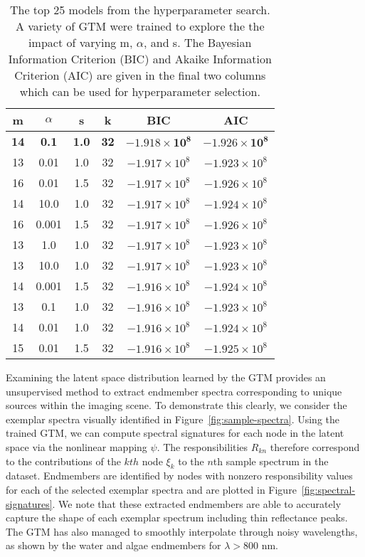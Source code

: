 \begin{table}
  \caption{The top 25 models from the hyperparameter search. A variety of GTM
    were trained to explore the the impact of varying m, $\alpha$, and s. The
    Bayesian Information Criterion (BIC) and Akaike Information Criterion (AIC)
    are given in the final two columns which can be used for hyperparameter
    selection.}
  \label{tab:hp-search}
  \begin{center}
  \begin{tabular}{cccccc} \hline
    \textbf{m} & \textbf{\boldmath$\alpha$} & \textbf{s} & \textbf{k} & \textbf{BIC} & \textbf{AIC} \\ \hline
    \textbf{14} & \textbf{0.1} & \textbf{1.0} & \textbf{32} & $\mathbf{-1.918 \times 10^8}$ & $\mathbf{-1.926 \times 10^8}$\\
    13 & 0.01 & 1.0 & 32 & $-1.917 \times 10^8$ & $-1.923 \times 10^8$\\
    16 & 0.01 & 1.5 & 32 & $-1.917 \times 10^8$ & $-1.926 \times 10^8$\\
    14 & 10.0 & 1.0 & 32 & $-1.917 \times 10^8$ & $-1.924 \times 10^8$\\
    16 & 0.001 & 1.5 & 32 & $-1.917 \times 10^8$ & $-1.926 \times 10^8$\\
    13 & 1.0 & 1.0 & 32 & $-1.917 \times 10^8$ & $-1.923 \times 10^8$\\
    13 & 10.0 & 1.0 & 32 & $-1.917 \times 10^8$ & $-1.923 \times 10^8$\\
    14 & 0.001 & 1.5 & 32 & $-1.916 \times 10^8$ & $-1.924 \times 10^8$\\
    13 & 0.1 & 1.0 & 32 & $-1.916 \times 10^8$ & $-1.923 \times 10^8$\\
    14 & 0.01 & 1.0 & 32 & $-1.916 \times 10^8$ & $-1.924 \times 10^8$\\
    15 & 0.01 & 1.5 & 32 & $-1.916 \times 10^8$ & $-1.925 \times 10^8$\\
  \end{tabular}
  \end{center}
\end{table}

Examining the latent space distribution learned by the GTM provides an
unsupervised method to extract endmember spectra corresponding to unique sources
within the imaging scene. To demonstrate this clearly, we consider the exemplar
spectra visually identified in Figure~\ref{fig:sample-spectra}. Using the
trained GTM, we can compute spectral signatures for each node in the latent
space via the nonlinear mapping $\psi$. The responsibilities $R_{kn}$ therefore
correspond to the contributions of the $kth$ node $\xi_k$ to the $n$th sample
spectrum in the dataset. Endmembers are identified by nodes with nonzero
responsibility values for each of the selected exemplar spectra and are plotted
in Figure~\ref{fig:spectral-signatures}. We note that these extracted endmembers
are able to accurately capture the shape of each exemplar spectrum including
thin reflectance peaks. The GTM has also managed to smoothly interpolate through
noisy wavelengths, as shown by the water and algae endmembers for $\lambda >
800$ nm.

